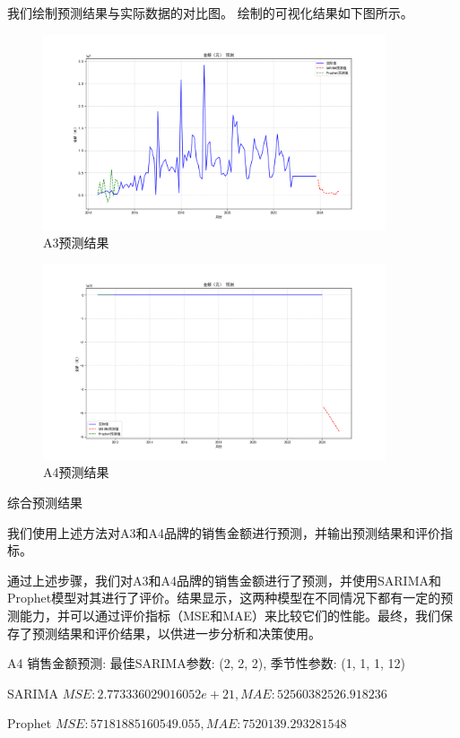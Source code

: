 \documentclass[a4paper]{article}
\begin{document}
	我们绘制预测结果与实际数据的对比图。
	绘制的可视化结果如下图所示。
	\begin{figure}[H]
		\centering
		\includegraphics[width=0.9\textwidth]{img/Second_1.png}
		\caption{A3预测结果}
	\end{figure}
	\begin{figure}[H]
		\centering
		\includegraphics[width=0.9\textwidth]{img/Second_2.png}
		\caption{A4预测结果}
	\end{figure}
	综合预测结果

	我们使用上述方法对A3和A4品牌的销售金额进行预测，并输出预测结果和评价指标。

	通过上述步骤，我们对A3和A4品牌的销售金额进行了预测，并使用SARIMA和Prophet模型对其进行了评价。结果显示，这两种模型在不同情况下都有一定的预测能力，并可以通过评价指标（MSE和MAE）来比较它们的性能。最终，我们保存了预测结果和评价结果，以供进一步分析和决策使用。
	
	A4 销售金额预测:
	最佳SARIMA参数: (2, 2, 2), 季节性参数: (1, 1, 1, 12)

	SARIMA $MSE: 2.773336029016052e+21, MAE: 52560382526.918236$

	Prophet $MSE: 57181885160549.055, MAE: 7520139.293281548$
	
\end{document}
